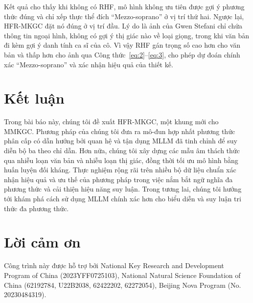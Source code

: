 \documentclass[10pt,twocolumn,a4paper]{article}
\begin{document}
Kết quả cho thấy khi không có RHF, mô hình không ưu tiên được gợi ý phương thức đúng và chỉ xếp thực thể đích ``Mezzo-soprano'' ở vị trí thứ hai. Ngược lại, HFR-MKGC đặt nó đúng ở vị trí đầu. Lý do là ảnh của Gwen Stefani chỉ chứa thông tin ngoại hình, không có gợi ý thị giác nào về loại giọng, trong khi văn bản đi kèm gợi ý danh tính ca sĩ của cô. Vì vậy RHF gán trọng số cao hơn cho văn bản và thấp hơn cho ảnh qua Công thức~\ref{eq:2}--\ref{eq:3}, cho phép dự đoán chính xác ``Mezzo-soprano'' và xác nhận hiệu quả của thiết kế.

\section{Kết luận}

Trong bài báo này, chúng tôi đề xuất HFR-MKGC, một khung mới cho MMKGC. Phương pháp của chúng tôi đưa ra mô-đun hợp nhất phương thức phân cấp có dẫn hướng bởi quan hệ và tận dụng MLLM đã tinh chỉnh để suy diễn bộ ba theo chỉ dẫn. Hơn nữa, chúng tôi xây dựng các mẫu âm thách thức qua nhiễu loạn văn bản và nhiễu loạn thị giác, đồng thời tối ưu mô hình bằng huấn luyện đối kháng. Thực nghiệm rộng rãi trên nhiều bộ dữ liệu chuẩn xác nhận hiệu quả và ưu thế của phương pháp trong việc nắm bắt ngữ nghĩa đa phương thức và cải thiện hiệu năng suy luận. Trong tương lai, chúng tôi hướng tới khám phá cách sử dụng MLLM chính xác hơn cho biểu diễn và suy luận tri thức đa phương thức.

\section*{Lời cảm ơn}
Công trình này được hỗ trợ bởi National Key Research and Development Program of China (2023YFF0725103), National Natural Science Foundation of China (62192784, U22B2038, 62422202, 62272054), Beijing Nova Program (No. 20230484319).
\end{document}
